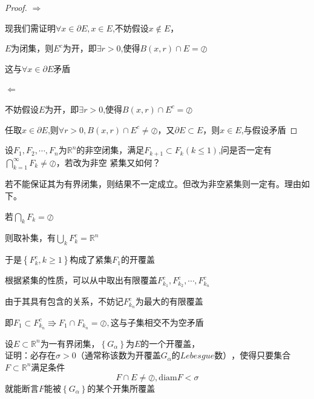 \documentclass[lang=cn,10pt]{elegantbook}
\begin{document}
\begin{proof}
	$\Rightarrow$
	
	现我们需证明$\forall x \in \partial E,x\in E$,$\text{不妨假设}x\notin E$，
	
	$E$为闭集，则$E^{c}$为开，即$\exists r>0$,使得$B(x,r)\cap E=\oslash$
	
	这与$\forall x \in \partial E$矛盾
	
	$\Leftarrow$
	
	不妨假设$E$为开，即$\exists r>0$,使得$B(x,r)\cap E^{c}= \oslash$
	
	任取$x \in \partial E$,则$\forall r>0,B(x,r)\cap E^{c}\ne \oslash$，又$\partial E \subset E$，则$x\in E$,与假设矛盾
\end{proof}
\begin{exercise}
	$\text{设}F_1,F_2,\cdots ,F_n\text{为}\mathbb{R} ^n\text{的非空闭集}$，满足$F_{k+1}\subset F_k(k\le 1)$,问是否一定有$\bigcap_{k=1}^{\infty}{F_k}\ne \oslash $，若改为非空
	紧集又如何？
\end{exercise}
\begin{solution}
	
	若不能保证其为有界闭集，则结果不一定成立。但改为非空紧集则一定有。理由如下。
	
	$\text{若}\bigcap_k{F_k}=\oslash $
	
	$\text{则取补集，有}\bigcup_k{F_{k}^{c}}=\mathbb{R} ^n$
	
	$\text{于是}\left\{ F_{k}^{c},k\ge 1 \right\} \text{构成了紧集}F_1\text{的开覆盖}$
	
	$\text{根据紧集的性质，可以从中取出有限覆盖}F_{k_1}^{c},F_{k_2}^{c},\cdots ,F_{k_n}^{c}$
	
	$\text{由于其具有包含的关系，不妨记}F_{k_n}^{c}\text{为最大的有限覆盖}$

	
	$\text{即}F_1\subset F_{k_n}^{c}\Rrightarrow F_1\cap F_{k_n}^{}=\oslash ,\text{这与子集相交不为空矛盾}$
\end{solution}
\begin{exercise}
	设$E\subset \mathbb{R} ^n$为一有界闭集，$\left\{ G_{\alpha} \right\} \text{为}E\text{的一个开覆盖}$，$\text{证明：必存在}\sigma >0\text{（通常称该数为开覆盖}G_{\alpha}\text{的}Lebesgue\text{数）}$，使得只要集合$F\subset\mathbb{R} ^n $满足条件
	\begin{equation*}
		F\cap E\ne \oslash,\mathrm{diam}F<\sigma 
	\end{equation*}
	就能断言$F$能被$\left\{ G_{\alpha} \right\} $的某个开集所覆盖
\end{exercise}
\end{document}
